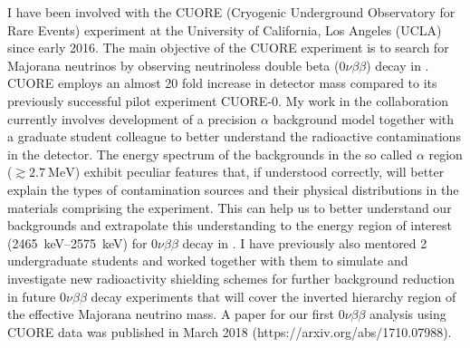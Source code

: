 \documentclass[10pt]{article} %
\begin{document}
I have been involved with the CUORE (Cryogenic Underground Observatory for Rare
Events) experiment at the University of California, Los Angeles (UCLA) since
early 2016. The main objective of the CUORE experiment is to search for
Majorana neutrinos by observing neutrinoless double beta ($0\nu\beta\beta$)
decay in . CUORE employs an almost 20 fold increase in detector
mass compared to its previously successful pilot experiment CUORE-0. My work in
the collaboration currently involves development of a precision $\alpha$
background model together with a graduate student colleague to better
understand the radioactive contaminations in the detector. The energy spectrum
of the backgrounds in the so called $\alpha$ region ($\gtrsim
\SI{2.7}{\mega\electronvolt}$) exhibit peculiar features that, if understood
correctly, will better explain the types of contamination sources and their
physical distributions in the materials comprising the experiment. This can
help us to better understand our backgrounds and extrapolate this understanding
to the energy region of interest (\SIrange{2465}{2575}{\kilo\electronvolt}) for
$0\nu\beta\beta$ decay in . I have previously also mentored 2
undergraduate students and worked together with them to simulate and
investigate new radioactivity shielding schemes for further background
reduction in future $0\nu\beta\beta$ decay experiments that will cover the
inverted hierarchy region of the effective Majorana neutrino mass. A paper for
our first $0\nu\beta\beta$ analysis using CUORE data was published in March
2018 (https://arxiv.org/abs/1710.07988).


\end{document}

